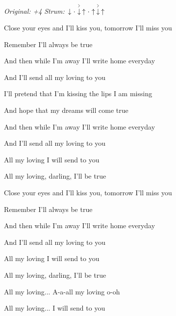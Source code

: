 \begin{song}


\begin{headerbox}
\RaiseBoxWithAccents
\textit{Original: +4} \quad
\textit{Strum:} $\Down\Miss\AccentDown\Up\Miss\Up\AccentDown\Up$
\end{headerbox}

\begin{hchordbox}
\end{hchordbox}

\Large

\bigskip

Close your eyes and I'll kiss you, tomorrow I'll miss you \par
Remember I'll always be true  \par
And then while I'm away I'll write home everyday \par
And I'll send all my loving to you \par

\bigskip

I'll pretend that I'm kissing the lips I am missing \par
And hope that my dreams will come true  \par
And then while I'm away I'll write home everyday \par
And I'll send all my loving to you \par

\bigskip

All my loving I will send to you \par
All my loving, darling, I'll be true \par

\bigskip

Close your eyes and I'll kiss you, tomorrow I'll miss you \par
Remember I'll always be true  \par
And then while I'm away I'll write home everyday \par
And I'll send all my loving to you \par

\bigskip

All my loving I will send to you \par
All my loving, darling, I'll be true \par

\bigskip

All my loving... A-a-all my loving o-oh \par
All my loving... I will send to you  \par

\end{song}
